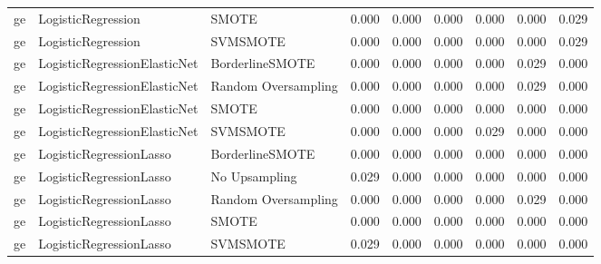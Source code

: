 \begin{tabular}{lllllllll}
      ge &           LogisticRegression &               SMOTE & 0.000 &                     0.000 &                 0.000 &                  0.000 &                                   0.000 &     0.029 \\
      ge &           LogisticRegression &            SVMSMOTE & 0.000 &                     0.000 &                 0.000 &                  0.000 &                                   0.000 &     0.029 \\
      ge & LogisticRegressionElasticNet &     BorderlineSMOTE & 0.000 &                     0.000 &                 0.000 &                  0.000 &                                   0.029 &     0.000 \\
      ge & LogisticRegressionElasticNet & Random Oversampling & 0.000 &                     0.000 &                 0.000 &                  0.000 &                                   0.029 &     0.000 \\
      ge & LogisticRegressionElasticNet &               SMOTE & 0.000 &                     0.000 &                 0.000 &                  0.000 &                                   0.000 &     0.000 \\
      ge & LogisticRegressionElasticNet &            SVMSMOTE & 0.000 &                     0.000 &                 0.000 &                  0.029 &                                   0.000 &     0.000 \\
      ge &      LogisticRegressionLasso &     BorderlineSMOTE & 0.000 &                     0.000 &                 0.000 &                  0.000 &                                   0.000 &     0.000 \\
      ge &      LogisticRegressionLasso &       No Upsampling & 0.029 &                     0.000 &                 0.000 &                  0.000 &                                   0.000 &     0.000 \\
      ge &      LogisticRegressionLasso & Random Oversampling & 0.000 &                     0.000 &                 0.000 &                  0.000 &                                   0.029 &     0.000 \\
      ge &      LogisticRegressionLasso &               SMOTE & 0.000 &                     0.000 &                 0.000 &                  0.000 &                                   0.000 &     0.000 \\
      ge &      LogisticRegressionLasso &            SVMSMOTE & 0.029 &                     0.000 &                 0.000 &                  0.000 &                                   0.000 &     0.000 \\

\end{tabular}
